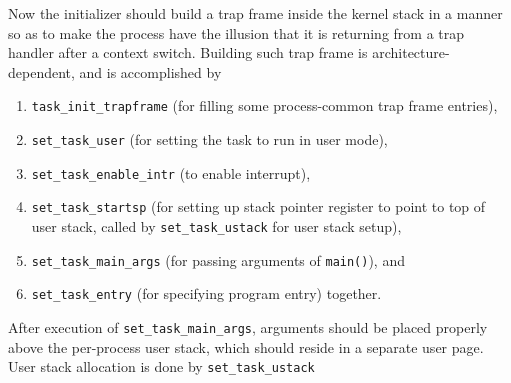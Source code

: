 \documentclass{report}
\newenvironment{hilight}{\color{red}}{\color{black}}
\begin{document}
\begin{hilight}
		Now the initializer should build a trap frame inside the kernel stack in a
		manner so as to make the process have the illusion that it is returning from
		a trap handler after a context switch.  Building such trap frame is
		architecture-dependent, and is accomplished by
		\begin{enumerate}
			\item \texttt{task\_init\_trapframe}
			 (for filling some process-common trap frame entries),
			\item \texttt{set\_task\_user}
			 (for setting the task to run in user mode),
			\item \texttt{set\_task\_enable\_intr}
			 (to enable interrupt),
			\item \texttt{set\_task\_startsp}
			 (for setting up stack pointer register to point to top of user stack,
			called by \texttt{set\_task\_ustack}
			for user stack setup),
			\item \texttt{set\_task\_main\_args}
			 (for passing arguments of \texttt{main()}), and
			\item \texttt{set\_task\_entry}
			 (for specifying program entry) together.
		\end{enumerate}
		After execution of \texttt{set\_task\_main\_args},
		arguments should be placed properly above the per-process user stack, which should reside in
		a separate user page.  User stack allocation is done by \texttt{set\_task\_ustack}
		\marginpar{
			\footnotesize\ttfamily
			\textcolor{red}{kern/sched/task.c:71}
		}


\end{hilight}
\end{document}
